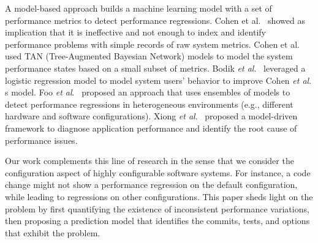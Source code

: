 A model-based approach builds %
a machine learning model with a set of performance metrics to detect performance regressions.  
Cohen et al.~\cite{Cohen:2005:CIC} showed as implication that it is ineffective and not enough to index and identify performance problems with simple records of raw system metrics. Cohen et al. used TAN (Tree-Augmented Bayesian Network) models to model the system performance states based on a small subset of metrics. %
Bodik \emph{et al$.$}~\cite{bodik2008hilighter} leveraged a logistic regression model to model system users' behavior to improve Cohen \emph{et al$.$}\textquotesingle s model. %
Foo \emph{et al$.$}~\cite{DBLP:conf/icse/FooJAHZF15} proposed an approach that uses ensembles of models to detect performance regressions in heterogeneous environments (e.g., different hardware and software configurations). %
Xiong \emph{et al$.$}~\cite{Xiong:2013:VAM} proposed a model-driven framework to diagnose application performance and identify the root cause of performance issues. %


Our work complements this line of research in the sense that we consider the configuration aspect of highly configurable software systems. For instance, a code change might not show a performance regression on the default configuration, while leading to regressions on other configurations. This paper sheds light on the \inconsistent problem by first quantifying the existence of inconsistent performance variations, then proposing a prediction model that identifies the commits, tests, and options that exhibit the \inconsistent problem. 
